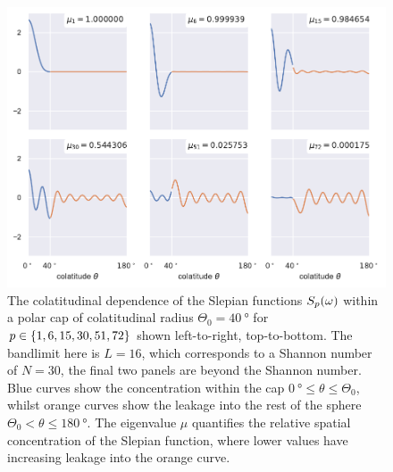 \begin{figure}[htpb]
	\centering\capstart{}
	\includegraphics[width=\textwidth]{slepian_colatitude.pdf}
	\caption[
		The colatitudinal dependence of the polar cap Slepian functions
	]{
		The colatitudinal dependence of the Slepian functions \({S}_{p}(\omega)\) within a polar cap of colatitudinal radius \(\Theta_{0}=\SI{40}{\degree}\) for \(p \in \{1, 6, 15, 30, 51, 72\}\) shown left-to-right, top-to-bottom.
		The bandlimit here is  \(L=16\), which corresponds to a Shannon number of \(N=30\), \ie{} the final two panels are beyond the Shannon number.
		Blue curves show the concentration within the cap \(\SI{0}{\degree} \leq \theta \leq \Theta_{0}{}\), whilst orange curves show the leakage into the rest of the sphere \(\Theta_{0} < \theta \leq \SI{180}{\degree}\).
		The eigenvalue \(\mu{}\) quantifies the relative spatial concentration of the Slepian function, where lower values have increasing leakage into the orange curve.
	}\label{fig:chapter2_slepian_colatitude}
\end{figure}
